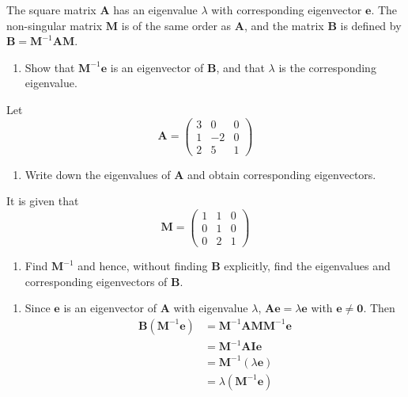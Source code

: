 \documentclass[leqno]{article}
\begin{document}
\begin{enumerate}[
  label=\textbf{\arabic*.},
  leftmargin=*,
  topsep=0pt,
  partopsep=0pt,
  parsep=0pt
]
The square matrix $\mathbf{A}$ has an eigenvalue $\lambda$ with corresponding eigenvector $\mathbf{e}$. The non-singular matrix $\mathbf{M}$ is of the same order as $\mathbf{A}$, and the matrix $\mathbf{B}$ is defined by $\mathbf{B} = \mathbf{M}^{-1}\mathbf{A}\mathbf{M}$. \\
\begin{enumerate}[label=\textbf{(\alph*)}]
  \item Show that $\mathbf{M}^{-1}\mathbf{e}$ is an eigenvector of $\mathbf{B}$, and that $\lambda$ is the corresponding eigenvalue.  \\
\end{enumerate}
Let
\[\mathbf{A} = \begin{pmatrix} 3 & 0 & 0 \\ 1 & -2 & 0 \\ 2 & 5 & 1 \end{pmatrix}\]
\begin{enumerate}[label=\textbf{(\alph*)}, resume]
  \item Write down the eigenvalues of $\mathbf{A}$ and obtain corresponding eigenvectors.  \\
\end{enumerate}
It is given that
\[\mathbf{M} = \begin{pmatrix} 1 & 1 & 0 \\ 0 & 1 & 0 \\ 0 & 2 & 1 \end{pmatrix}\]
\begin{enumerate}[label=\textbf{(\alph*)}, resume]
  \item Find $\mathbf{M}^{-1}$ and hence, without finding $\mathbf{B}$ explicitly, find the eigenvalues and corresponding eigenvectors of $\mathbf{B}$.  \\
\end{enumerate}

\vspace*{10pt}

\begin{djsSolution}
\begin{enumerate}[label=\textbf{(\alph*)}, start=1]
  \item Since \(\mathbf{e}\) is an eigenvector of \(\mathbf{A}\) with eigenvalue \(\lambda\), \(\mathbf{A}\mathbf{e}=\lambda\mathbf{e}\) with \(\mathbf{e}\neq\mathbf{0}\). Then
\begin{align*}
\mathbf{B}\left(\mathbf{M}^{-1}\mathbf{e}\right) &= \mathbf{M}^{-1}\mathbf{A}\mathbf{M}\mathbf{M}^{-1}\mathbf{e}\\
&= \mathbf{M}^{-1}\mathbf{A}\mathbf{I}\mathbf{e}\\
&= \mathbf{M}^{-1}\left(\lambda\mathbf{e}\right)\\
&= \lambda\left(\mathbf{M}^{-1}\mathbf{e}\right)
\end{align*}


\end{enumerate}
\end{djsSolution}
\end{enumerate}
\end{document}
